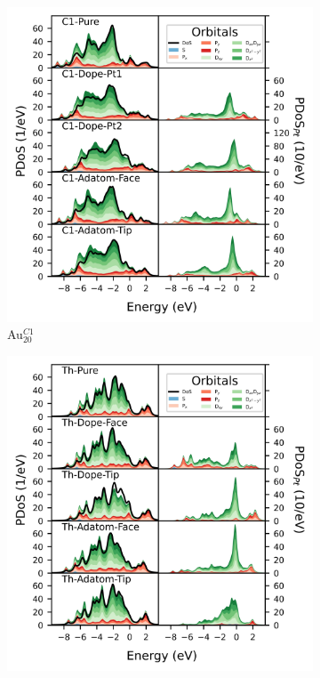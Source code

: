 \begin{figure}
\centering
\begin{subfigure}[b]{0.45\textwidth}
    \includegraphics[width=\textwidth]{figures/LM/AuPt_EPJ/C1DoS.jpeg}
    \caption{Au$_{20}^{C1}$} 
    \label{Fig:C1Dos}
\end{subfigure}
\begin{subfigure}[b]{0.45\textwidth}
    \includegraphics[width=\textwidth]{figures/LM/AuPt_EPJ/ThDoS.jpeg}

\end{subfigure}
\end{figure}
